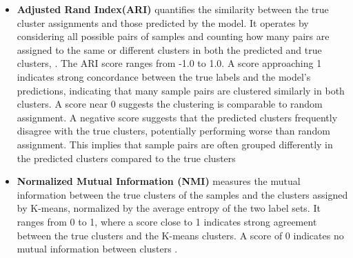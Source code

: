 \documentclass[gmd, manuscript]{copernicus}
\providecommand{\DIFaddtex}[1]{{\protect\color{blue}\uwave{#1}}} %
\providecommand{\DIFaddbegin}{} %
\providecommand{\DIFaddend}{} %
\providecommand{\DIFadd}[1]{\texorpdfstring{\DIFaddtex{#1}}{#1}} %
\newcommand{\DIFaddincludegraphics}[2][]{{\color{blue}\fbox{\DIFOincludegraphics[#1]{#2}}}} %
\DeclareRobustCommand{\DIFaddbegin}{\DIFOaddbegin \let\includegraphics\DIFaddincludegraphics} %
\DeclareRobustCommand{\DIFaddend}{\DIFOaddend \let\includegraphics\DIFOincludegraphics} %
\begin{document}
\begin{itemize}
 \DIFaddend \item  \textbf{Adjusted Rand Index(ARI)}  quantifies the similarity between the true cluster assignments and those predicted by the model. It operates by considering all possible pairs of samples and counting how many pairs are assigned to the same or different clusters in both the predicted and true clusters, \cite{chacon2023minimum, chekir20173d}. The ARI score ranges from -1.0 to 1.0. A score approaching 1 indicates strong concordance between the true labels and the model's predictions, indicating that many sample pairs are clustered similarly in both clusters. A score near 0 suggests the clustering is comparable to random assignment. A negative score suggests that the predicted clusters frequently disagree with the true clusters, potentially performing worse than random assignment. This implies that sample pairs are often grouped differently in the predicted clusters compared to the true clusters\DIFaddbegin \DIFadd{.
 }\DIFaddend %
\item \textbf{Normalized Mutual Information (NMI)} measures the mutual information between the true clusters of the samples and the clusters assigned by K-means, normalized by the average entropy of the two label sets. It ranges from 0 to 1, where a score close to 1 indicates strong agreement between the true clusters and the K-means clusters. A score of 0 indicates no mutual information between clusters \citep{kvaalseth2017normalized}.
\end{itemize}
\end{document}
